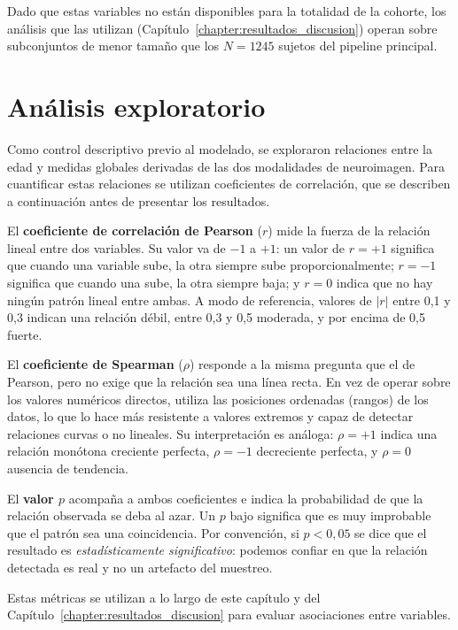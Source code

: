 Dado que estas variables no están disponibles para la totalidad de la cohorte, los análisis que las utilizan (Capítulo~\ref{chapter:resultados_discusion}) operan sobre subconjuntos de menor tamaño que los $N = 1245$ sujetos del pipeline principal.


\section{Análisis exploratorio}
\label{sec:analisis_exploratorio}

Como control descriptivo previo al modelado, se exploraron relaciones entre la edad y medidas globales derivadas de las dos modalidades de neuroimagen. Para cuantificar estas relaciones se utilizan coeficientes de correlación, que se describen a continuación antes de presentar los resultados.

El \textbf{coeficiente de correlación de Pearson} ($r$) mide la fuerza de la relación lineal entre dos variables. Su valor va de $-1$ a $+1$: un valor de $r = +1$ significa que cuando una variable sube, la otra siempre sube proporcionalmente; $r = -1$ significa que cuando una sube, la otra siempre baja; y $r = 0$ indica que no hay ningún patrón lineal entre ambas. A modo de referencia, valores de $|r|$ entre 0{,}1 y 0{,}3 indican una relación débil, entre 0{,}3 y 0{,}5 moderada, y por encima de 0{,}5 fuerte.

El \textbf{coeficiente de Spearman} ($\rho$) responde a la misma pregunta que el de Pearson, pero no exige que la relación sea una línea recta. En vez de operar sobre los valores numéricos directos, utiliza las posiciones ordenadas (rangos) de los datos, lo que lo hace más resistente a valores extremos y capaz de detectar relaciones curvas o no lineales. Su interpretación es análoga: $\rho = +1$ indica una relación monótona creciente perfecta, $\rho = -1$ decreciente perfecta, y $\rho = 0$ ausencia de tendencia.

El \textbf{valor $p$} acompaña a ambos coeficientes e indica la probabilidad de que la relación observada se deba al azar. Un $p$ bajo significa que es muy improbable que el patrón sea una coincidencia. Por convención, si $p < 0{,}05$ se dice que el resultado es \textit{estadísticamente significativo}: podemos confiar en que la relación detectada es real y no un artefacto del muestreo.

Estas métricas se utilizan a lo largo de este capítulo y del Capítulo~\ref{chapter:resultados_discusion} para evaluar asociaciones entre variables.

